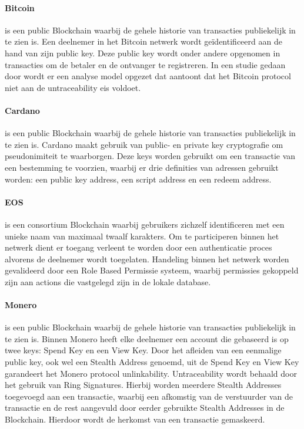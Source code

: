 \paragraph{Bitcoin} is een public Blockchain waarbij de gehele historie van transacties publiekelijk in te zien is. Een deelnemer in het Bitcoin netwerk wordt geïdentificeerd aan de hand van zijn public key. Deze public key wordt onder andere opgenomen in transacties om de betaler en de ontvanger te registreren. In een studie gedaan door \cite{reid2013analysis} wordt er een analyse model opgezet dat aantoont dat het Bitcoin protocol niet aan de untraceability eis voldoet.

\paragraph{Cardano} is een public Blockchain waarbij de gehele historie van transacties publiekelijk in te zien is. Cardano maakt gebruik van public- en private key cryptografie om pseudonimiteit te waarborgen. Deze keys worden gebruikt om een transactie van een bestemming te voorzien, waarbij er drie definities van adressen gebruikt worden: een public key address, een script address en een redeem address.

\paragraph{EOS} is een consortium Blockchain waarbij gebruikers zichzelf identificeren met een unieke naam van maximaal twaalf karakters. Om te participeren binnen het netwerk dient er toegang verleent te worden door een authenticatie proces alvorens de deelnemer wordt toegelaten.  Handeling binnen het netwerk worden gevalideerd door een Role Based Permissie systeem, waarbij permissies gekoppeld zijn aan actions die vastgelegd zijn in de lokale database.

\paragraph{Monero} is een public Blockchain waarbij de gehele historie van transacties publiekelijk in te zien is. Binnen Monero heeft elke deelnemer een account die gebaseerd is op twee keys: Spend Key en een View Key. Door het afleiden van een eenmalige public key, ook wel een Stealth Address genoemd, uit de Spend Key en View Key garandeert het Monero protocol unlinkability. Untraceability wordt behaald door het gebruik van Ring Signatures. Hierbij worden meerdere Stealth Addresses toegevoegd aan een transactie, waarbij een afkomstig van de verstuurder van de transactie en de rest aangevuld door eerder gebruikte Stealth Addresses in de Blockchain. Hierdoor wordt de herkomst van een transactie gemaskeerd. 